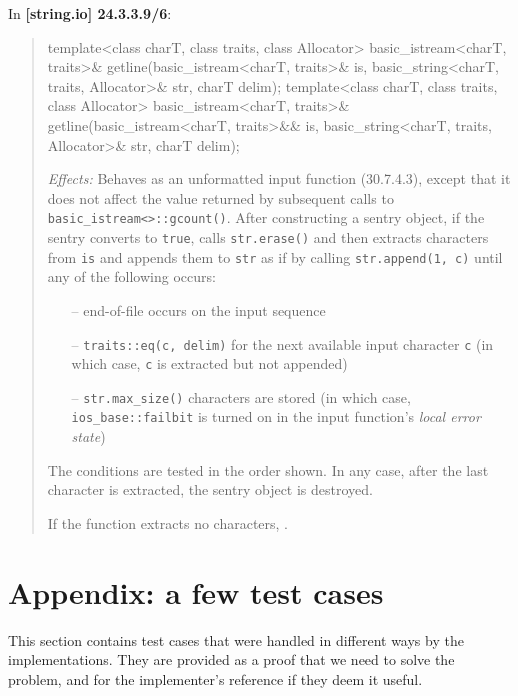 \documentclass{wg21}
\begin{document}
In \textbf{[string.io] 24.3.3.9/6}:
\begin{quote}
\begin{codeblock}
template<class charT, class traits, class Allocator>
basic_istream<charT, traits>&
  getline(basic_istream<charT, traits>& is,
          basic_string<charT, traits, Allocator>& str,
          charT delim);
template<class charT, class traits, class Allocator>
basic_istream<charT, traits>&
  getline(basic_istream<charT, traits>&& is,
          basic_string<charT, traits, Allocator>& str,
          charT delim);
\end{codeblock}
\textit{Effects:} Behaves as an unformatted input function (30.7.4.3), except
that it does not affect the value returned by subsequent calls to \texttt{basic_istream<>::gcount()}.
After constructing a sentry object, if the sentry converts to \texttt{true},
calls \texttt{str.erase()} and then extracts characters from \texttt{is} and
appends them to \texttt{str} as if by calling \texttt{str.append(1, c)} until
any of the following occurs:
\begin{itemize}
  \item[--] end-of-file occurs on the input sequence\added{;}
  \item[--] \texttt{traits::eq(c, delim)} for the next available input character
            \texttt{c} (in which case, \texttt{c} is extracted but not appended)
  \item[--] \texttt{str.max_size()} characters are stored (in which case,
            {\texttt{ios_base::failbit} is turned on in the input function's \textit{local error state}})
\end{itemize}
The conditions are tested in the order shown. In any case, after the last
character is extracted, the sentry object is destroyed.

If the function extracts no characters, .
\end{quote}


\section{Appendix: a few test cases}
This section contains test cases that were handled in different ways by the
implementations. They are provided as a proof that we need to solve the problem,
and for the implementer's reference if they deem it useful.
\end{document}
